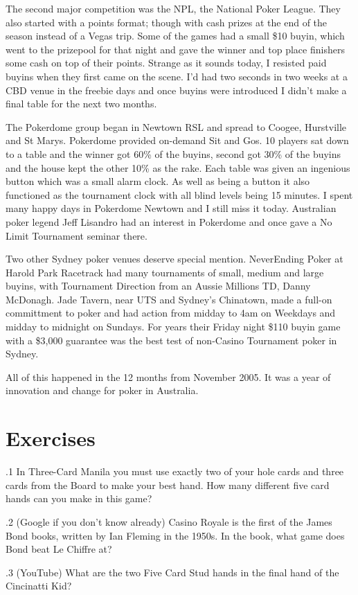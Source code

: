 The second major competition was the NPL, the National Poker
League. They also started with a points format; though with
cash prizes at the end of the season instead of a Vegas trip. Some of
the games had a small \$10 buyin, which went to the prizepool for that
night and gave the winner and top place finishers some cash on top of
their points. Strange as it sounds today, I resisted
paid buyins when they first came on the scene. I'd had two seconds in
two weeks at a CBD venue in the freebie days and once buyins were
introduced I didn't make a final table for the next two months.


The Pokerdome group began in Newtown RSL and spread to Coogee,
Hurstville and St Marys. Pokerdome provided on-demand Sit and Gos.
10 players sat down to a table and the winner got 60\% of the buyins,
second got 30\% of the buyins and the house kept the other 10\% as the
rake. Each table was given an ingenious button which was a small
alarm clock. As well as being a button it also functioned
as the tournament clock with all blind levels being 15 minutes.
I spent many happy days in Pokerdome Newtown and I still miss it
today. Australian poker legend Jeff Lisandro had an interest in
Pokerdome and once gave a No Limit Tournament seminar there.

Two other Sydney poker venues deserve special mention. NeverEnding
Poker at Harold Park Racetrack had many tournaments of small, medium
and large buyins, with Tournament Direction from an Aussie Millions
TD, Danny McDonagh. Jade Tavern, near UTS and Sydney's Chinatown, made
a full-on committment to poker and had action from midday to 4am on
Weekdays and midday to midnight on Sundays. For years their Friday
night \$110 buyin game with a \$3,000 guarantee was the best test of
non-Casino Tournament poker in Sydney.

All of this happened in the 12 months from November 2005. It was a
year of innovation and change for poker in Australia.


\section{Exercises}

.1 In Three-Card Manila you must use exactly two of
your hole cards and three cards from the Board to make your best
hand. How many different five card hands can you make in this game?

.2 (Google if you don't know already) Casino Royale
is the first of the James Bond books, written by Ian Fleming in the
1950s. In the book, what game does Bond beat Le Chiffre at?

.3 (YouTube) What are the two Five Card Stud hands in
the final hand of the Cincinatti Kid?
